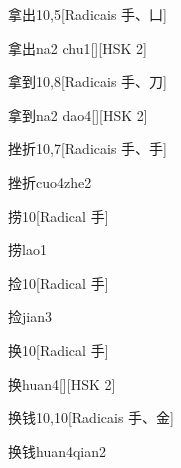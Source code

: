 \begin{entry}{拿出}{10,5}[Radicais ⼿、⼐]
  \begin{phonetics}{拿出}{na2 chu1}[][HSK 2]
  \end{phonetics}
\end{entry}

\begin{entry}{拿到}{10,8}[Radicais ⼿、⼑]
  \begin{phonetics}{拿到}{na2 dao4}[][HSK 2]
  \end{phonetics}
\end{entry}

\begin{entry}{挫折}{10,7}[Radicais ⼿、⼿]
  \begin{phonetics}{挫折}{cuo4zhe2}
  \end{phonetics}
\end{entry}

\begin{entry}{捞}{10}[Radical ⼿]
  \begin{phonetics}{捞}{lao1}
  \end{phonetics}
\end{entry}

\begin{entry}{捡}{10}[Radical ⼿]
  \begin{phonetics}{捡}{jian3}
  \end{phonetics}
\end{entry}

\begin{entry}{换}{10}[Radical ⼿]
  \begin{phonetics}{换}{huan4}[][HSK 2]
  \end{phonetics}
\end{entry}

\begin{entry}{换钱}{10,10}[Radicais ⼿、⾦]
  \begin{phonetics}{换钱}{huan4qian2}
  \end{phonetics}
\end{entry}

